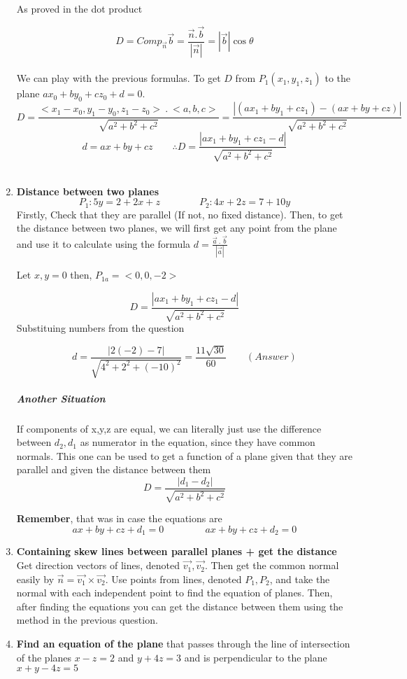 \documentclass{article}
\begin{document}
\begin{enumerate}[1.]
		As proved in the dot product 

		\[
			D = Comp_{ \vec{ n } } \vec{ b } 			= \frac{ \vec{ n } . \vec{ b } }{ | \vec{ n }| } = | \vec{ b } | \cos{ \theta } 
		\]
		\\ 
		We can play with the previous formulas. To get $D$ from $P_1(x_1,y_1,z_1)$ to the plane $ax_0+by_0+cz_0+d=0$.
		\[
			D = \frac{ <x_1-x_0, y_1-y_0, z_1-z_0>\ .\ <a,b,c> }{ \sqrt{a^2+b^2+c^2}}=  \frac{ |(ax_1+by_1+cz_1)-(ax+by+cz)| }{ \sqrt{a^2+b^2+c^2} }
		\]
		\[
			d = ax+by+cz \qquad	\therefore D = \frac{ |ax_1+by_1+cz_1-d| }{ \sqrt{a^2+b^2+c^2} }
		\]
		\\

	\item \textbf{Distance between two planes}
		\[
			P_1:5y=2+2x+z \qquad \qquad P_2:4x+2z=7+10y
		\]
		Firstly, Check that they are parallel (If not, no fixed distance). Then, to get the distance between two planes, we will first get any point from the plane and use it to calculate using the formula $ d = \frac{ \vec{ a }\ .\ \vec{ b } }{ | \vec{ a } | } $

		Let $x,y=0$ then, $P_{1a} = <0,0,-2>$

		\[
			D =  \frac{ |ax_1+by_1+cz_1-d| }{ \sqrt{a^2+b^2+c^2} }
		\]
		Substituing numbers from the question

		\[
			d = \frac{ |2(-2)-7| }{ \sqrt{4^2+2^2+(-10)^2} } = \frac{ 11 \sqrt{ 30 } }{ 60 }\qquad (Answer)
		\]
		\subparagraph{Another Situation}
		If components of x,y,z are equal, we can literally just use the difference between $d_2, d_1$ as numerator in the equation, since they have common normals. This one can be used to get a function of a plane given that they are parallel and given the distance between them
		\[
			D = \frac{ |d_1-d_2| }{ \sqrt{a^2+b^2+c^2} } 
		\]

		\textbf{Remember}, that was in case the equations are
		\[ ax + by + cz + d_1 = 0\ \qquad \qquad  ax + by + cz + d_2 = 0 \]
	\item \textbf{Containing skew lines between parallel planes + get the distance}
		Get direction vectors of lines, denoted $ \vec{ v_1 }, \vec{ v_2} $. Then get the common normal easily by $ \vec{ n }= \vec{ v_1 } \times \vec{ v_2 }$. Use points from lines, denoted $P_1, P_2$, and take the normal with each independent point to find the equation of planes. Then, after finding the equations you can get the distance between them using the method in the previous question.

	\item \textbf{Find an equation of the plane} that passes through the line of intersection of the planes $x - z = 2$ and $y + 4z = 3$ and is perpendicular to the plane $x+y-4z=5$


\end{enumerate}
\end{document}
